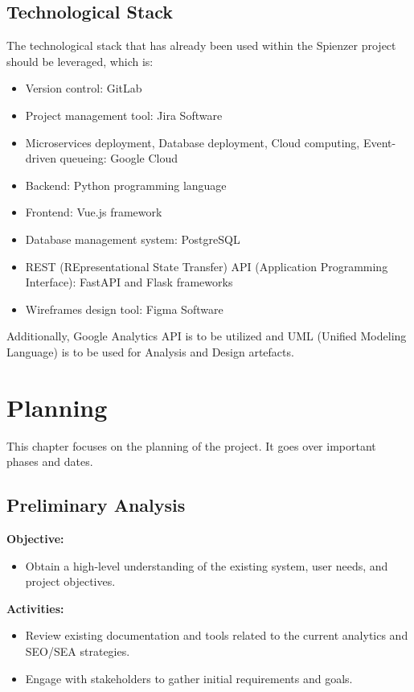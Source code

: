 \documentclass[12pt,a4paper]{article}
\begin{document}
\subsection{Technological Stack}
The technological stack that has already been used within the Spienzer project should be leveraged, which is: 
\begin{itemize}
    \item Version control: GitLab
    \item Project management tool: Jira Software
    \item Microservices deployment, Database deployment, Cloud computing, Event-driven queueing: Google Cloud
    \item Backend: Python programming language
    \item Frontend: Vue.js framework
    \item Database management system: PostgreSQL
    \item REST (REpresentational State Transfer) API (Application Programming Interface): FastAPI and Flask frameworks
    \item Wireframes design tool: Figma Software
\end{itemize}
Additionally, Google Analytics API is to be utilized and UML (Unified Modeling Language) is to be used for Analysis and Design artefacts.
\newpage
\section{Planning}
This chapter focuses on the planning of the project. It goes over important phases and dates.
\subsection{Preliminary Analysis}

\noindent \textbf{Objective:}
\begin{itemize}
    \item Obtain a high-level understanding of the existing system, user needs, and project objectives.
\end{itemize}

\noindent \textbf{Activities:}
\begin{itemize}
    \item Review existing documentation and tools related to the current analytics and SEO/SEA strategies.
    \item Engage with stakeholders to gather initial requirements and goals.
\end{itemize}
\end{document}
